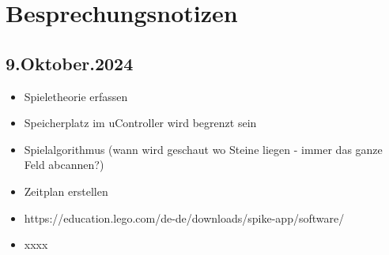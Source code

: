\chapter*{Besprechungsnotizen}

\section{9.Oktober.2024}

\begin{itemize}
	\item Spieletheorie erfassen
	\item Speicherplatz im uController wird begrenzt sein
	\item Spielalgorithmus (wann wird geschaut wo Steine liegen - immer das ganze Feld abcannen?)
	\item Zeitplan erstellen
	\item  https://education.lego.com/de-de/downloads/spike-app/software/
	\item xxxx
\end{itemize}
